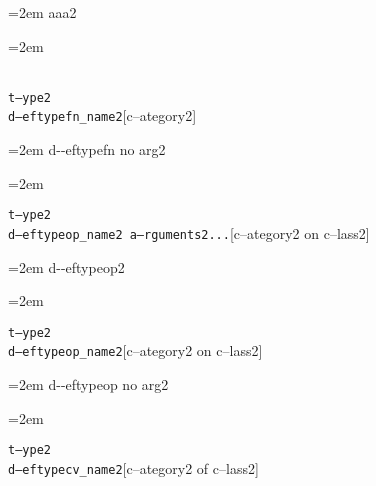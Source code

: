 \documentclass{book}
\begin{document}
%
\par\begingroup\obeylines\obeyspaces\frenchspacing\leftskip=2em\relax\parskip=0pt\relax\ttfamily{}%
aaa2
\endgroup{}%
\par\begingroup\obeylines\obeyspaces\frenchspacing\leftskip=2em\relax\parskip=0pt\relax\ttfamily{}%

\endgroup{}%
\noindent\texttt\bgroup{}\leavevmode{}\\t--ype2\leavevmode{}\\d--eftypefn\_name2\egroup{}\hfill[c--ategory2]



%
\par\begingroup\obeylines\obeyspaces\frenchspacing\leftskip=2em\relax\parskip=0pt\relax\ttfamily{}%
d{-}{-}eftypefn no arg2
\endgroup{}%
\par\begingroup\obeylines\obeyspaces\frenchspacing\leftskip=2em\relax\parskip=0pt\relax\ttfamily{}%

\endgroup{}%
\noindent\texttt\bgroup{}t--ype2\leavevmode{}\\d--eftypeop\_name2 a--rguments2...\egroup{}\hfill[c--ategory2 on c--lass2]



%
\par\begingroup\obeylines\obeyspaces\frenchspacing\leftskip=2em\relax\parskip=0pt\relax\ttfamily{}%
d{-}{-}eftypeop2
\endgroup{}%
\par\begingroup\obeylines\obeyspaces\frenchspacing\leftskip=2em\relax\parskip=0pt\relax\ttfamily{}%

\endgroup{}%
\noindent\texttt\bgroup{}t--ype2\leavevmode{}\\d--eftypeop\_name2\egroup{}\hfill[c--ategory2 on c--lass2]



%
\par\begingroup\obeylines\obeyspaces\frenchspacing\leftskip=2em\relax\parskip=0pt\relax\ttfamily{}%
d{-}{-}eftypeop no arg2
\endgroup{}%
\par\begingroup\obeylines\obeyspaces\frenchspacing\leftskip=2em\relax\parskip=0pt\relax\ttfamily{}%

\endgroup{}%
\noindent\texttt\bgroup{}t--ype2\leavevmode{}\\d--eftypecv\_name2\egroup{}\hfill[c--ategory2 of c--lass2]
\end{document}
